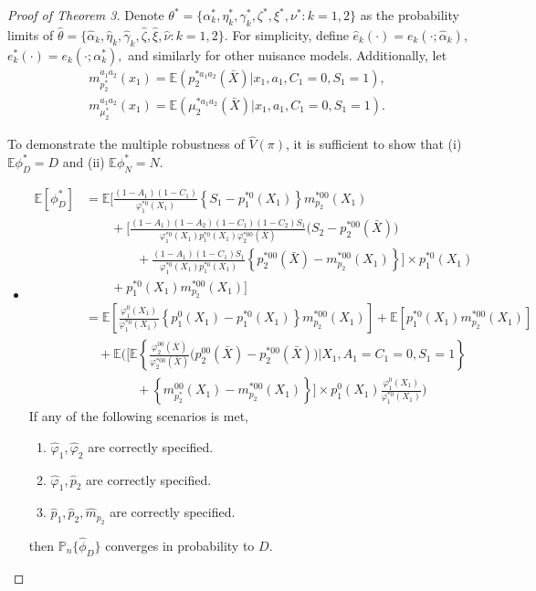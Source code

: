\documentclass{article}
\newcommand{\wh}{\widehat}
\newcommand{\pk}{{\varphi}}
\newcommand{\pr}{\mathbb{P}}
\begin{document}
\begin{proof}[Proof of Theorem 3]

Denote $\theta^* = \{ \alpha_k^*, \eta_k^*, \gamma_k^*, \zeta^*, \xi^*, \nu^*: k=1,2 \}$ as the probability limits of $\hat\theta = \{ \hat\alpha_k, \hat\eta_k, \hat\gamma_k, \hat\zeta, \hat\xi, \hat\nu: k=1,2 \}$. For simplicity, define
$\wh e_k(\cdot) = e_k(\cdot; \hat\alpha_k)$,
$e_k^*(\cdot) = e_k(\cdot; \alpha_k^*),$
and similarly for other nuisance models.
Additionally, let
	\begin{gather*}
		m_{p_2^*}^{a_1a_2}(x_1) = \mathbb E(p_2^{*a_1a_2}(\bar X)|x_1,a_1,C_1=0,S_1=1), \\
		m_{\mu_2^*}^{a_1a_2}(x_1)  = \mathbb E(\mu_2^{*a_1a_2}(\bar X) |x_1,a_1,C_1=0,S_1=1).
	\end{gather*}

To demonstrate the multiple robustness of $\wh V(\pi)$, it is sufficient to show that (i) $\mathbb E\phi_D^* = D$ and (ii) $\mathbb E\phi_N^* = N$.

\begin{itemize}
	\item[(i)] 
	\begin{align*}
		\mathbb E[\phi_D^*]
		&= \mathbb E \bigg[ 
		\frac{(1-A_1)(1-C_1)}{\pk_1^{*0}(X_1)} \left\{S_1 - p_1^{*0}(X_1)\right\} m_{p_2}^{*00}(X_1) \\
	      &\qquad+ \bigg[ \frac{(1-A_1)(1-A_2)(1-C_1)(1-C_2)S_1}{\pk_1^{*0}(X_1)p_1^{*0}(X_1)\pk_2^{*00}(\bar X)} \big(S_2 - p_2^{*00}(\bar X)\big) \\
	      &\qquad\qquad+ 
	   	    \frac{(1-A_1)(1-C_1)S_1}{\pk_1^{*0}(X_1)p_1^{*0}(X_1)} \left\{ p_2^{*00}(\bar X) - m_{p_2}^{*00}(X_1) \right\} \bigg] \times p_1^{*0}(X_1) \\
	      &\qquad+ p_1^{*0}(X_1) m_{p_2}^{*00}(X_1) \bigg] \\
	    &= \mathbb E\left[ \frac{\pk_1^{0}(X_1)}{\pk_1^{*0}(X_1)} \left\{p_1^{0}(X_1) - p_1^{*0}(X_1)\right\} m_{p_2}^{*00}(X_1) \right] + \mathbb E\left[ p_1^{*0}(X_1) m_{p_2}^{*00}(X_1) \right] \\
	   	  &\quad+ \mathbb E\Bigg( \bigg[ \mathbb E \left\{
	   	      \frac{\pk_2^{00}(\bar X)}{\pk_2^{*00}
	   	      (\bar X)} \big(p_2^{00}(\bar X) - p_2^{*00}(\bar X)\big) \bigg\vert X_1, A_1=C_1=0, S_1=1
	   	      \right\} \\
	   	   &\qquad\qquad+
	   	    \left\{ m_{p^*_2}^{00}(X_1) - m_{p_2}^{*00}(X_1) \right\} \bigg] \times p_1^{0}(X_1) \frac{\pk_1^{0}(X_1)}
	   	    {\pk_1^{*0}(X_1)} \Bigg)
	\end{align*}
	If any of the following scenarios is met,
	\begin{enumerate}
		\item[(i-1)] $\widehat{\pk}_1, \widehat{\pk}_2$ are correctly specified.
		\item[(i-2)] $\widehat{\pk}_1, \widehat p_2$ are correctly specified.
		\item[(i-3)] $\widehat p_1, \widehat p_2, \widehat m_{p_2}$ are correctly specified.
	\end{enumerate}
	then $\pr_n\{\hat\phi_D\}$ converges in probability to $D$.



\end{itemize}
\end{proof}
\end{document}
